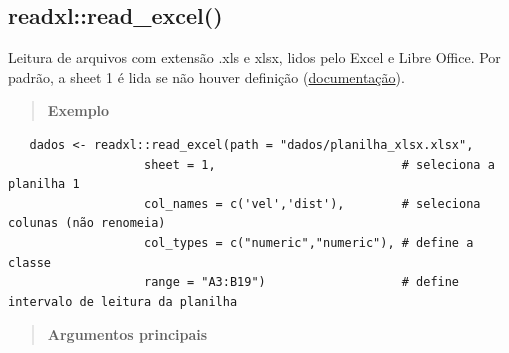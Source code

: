\documentclass[
]{book}
\theoremstyle{definition}
\theoremstyle{definition}
\theoremstyle{definition}
\theoremstyle{definition}
\theoremstyle{remark}
\begin{document}
\hypertarget{readxlread_excel}{%
\subsection{readxl::read\_excel()}\label{readxlread_excel}}

Leitura de arquivos com extensão .xls e xlsx, lidos pelo Excel e Libre Office. Por padrão, a sheet 1 é lida se não houver definição (\href{https://www.rdocumentation.org/packages/readxl/versions/0.1.1/topics/read_excel}{documentação}).

\begin{quote}
\textbf{Exemplo}
\end{quote}

\begin{verbatim}
   dados <- readxl::read_excel(path = "dados/planilha_xlsx.xlsx",
                   sheet = 1,                          # seleciona a planilha 1
                   col_names = c('vel','dist'),        # seleciona colunas (não renomeia)
                   col_types = c("numeric","numeric"), # define a classe
                   range = "A3:B19")                   # define intervalo de leitura da planilha
\end{verbatim}

\begin{quote}
\textbf{Argumentos principais}
\end{quote}
\end{document}
